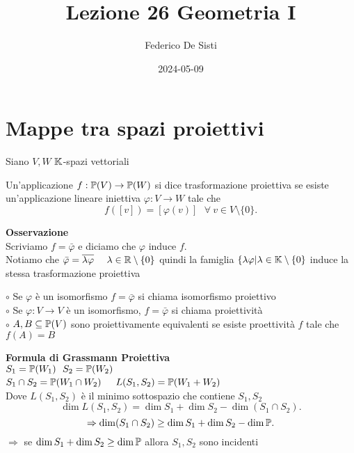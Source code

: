 \documentclass[12px]{article}
\title{Lezione 26 Geometria I}
\date{2024-05-09}
\author{Federico De Sisti}
\begin{document}
	\maketitle
	\newpage
	\section{Mappe tra spazi proiettivi}
		Siano $V,W$ $\mathbb{K}$-spazi vettoriali
	\begin{defi}
		Un'applicazione $f:\mathbb{P}(V) \rightarrow\mathbb{P}(W)$ si dice trasformazione proiettiva se esiste un'applicazione lineare iniettiva $\varphi : V \rightarrow W$ tale che 
		\[
			f([v])=[ \varphi(v)] \ \ \ \forall \ v  \in V\setminus\{0\}
		.\] 
	\end{defi}
	\textbf{Osservazione}\\
	Scriviamo $f = \bar{\varphi}$ e diciamo che $\varphi$ induce $f$.\\
	Notiamo che $\bar{\varphi} = \overline{ \lambda \varphi} \ \ \ \ \lambda\in \mathbb{R}\setminus\{0\}$ quindi la famiglia $\{ \lambda \varphi | \lambda\in \mathbb{K}\setminus\{0\}$ induce la stessa trasformazione proiettiva
	\begin{nome}
		$\circ$ Se $\varphi$ è un isomorfismo $f=\bar \varphi$ si chiama isomorfismo proiettivo\\
		$\circ$ Se $\varphi : V \rightarrow V$ è un isomorfismo, $f=\bar \varphi$ si chiama proiettività\\
		$\circ$ $A,B\subseteq\mathbb{P}(V)$ sono proiettivamente equivalenti se esiste proettività $f$ tale che $f(A)=B$
	\end{nome}
	\textbf{Formula di Grassmann Proiettiva}\\
	$S_1 = \mathbb{P}(W_1) \ \ S_2 = \mathbb{P}(W_2)$\\
	$S_1\cap S_2=\mathbb{P}(W_1\cap W_2)$ $\ \ \ L(S_1,S_2) = \mathbb{P}(W_1+W_2)$\\
	Dove $L(S_1,S_2)$ è il minimo sottospazio che contiene $S_1,S_2$\\
	\[
	\dim L(S_1,S_2) = \dim S_1 + \dim S_2 - \dim (S_1\cap S_2)
	.\] 
	\[
	\Rightarrow \dim(S_1\cap S_2) \geq \dim S_1 + \dim S_2 - \dim\mathbb{P}
	.\] 
	$ \Rightarrow$  se $\dim S_1 + \dim S_2\geq \dim \mathbb{P}$ allora $S_1,S_2$ sono incidenti
\end{document}
